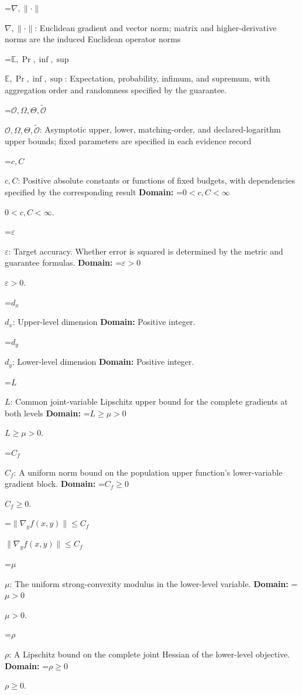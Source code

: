 \documentclass[10pt,a4paper]{article}
\newcommand{\AtlasMath}[1]{\par\begingroup\centering\setbox0=\hbox{$\displaystyle #1$}\ifdim\wd0>1.4\linewidth\typeout{ATLAS WIDE FORMULA: \the\wd0}\fi\ifdim\wd0>\linewidth\resizebox{\linewidth}{!}{\box0}\else\box0\fi\par\endgroup}
\newcommand{\AtlasInlineMath}[1]{\begingroup\setbox0=\hbox{$#1$}\ifdim\wd0>.4\linewidth\endgroup\AtlasMath{#1}\else\endgroup$#1$\fi}
\begin{document}
\AtlasInlineMath{\nabla,\|\cdot\|}: Euclidean gradient and vector norm; matrix and higher-derivative norms are the induced Euclidean operator norms



\AtlasInlineMath{\mathbb E,\Pr,\inf,\sup}: Expectation, probability, infimum, and supremum, with aggregation order and randomness specified by the guarantee.



\AtlasInlineMath{\mathcal O,\Omega,\Theta,\widetilde{\mathcal O}}: Asymptotic upper, lower, matching-order, and declared-logarithm upper bounds; fixed parameters are specified in each evidence record



\AtlasInlineMath{c,C}: Positive absolute constants or functions of fixed budgets, with dependencies specified by the corresponding result \textbf{Domain:} \AtlasInlineMath{0<c,C<\infty}.



\AtlasInlineMath{\varepsilon}: Target accuracy. Whether error is squared is determined by the metric and guarantee formulas. \textbf{Domain:} \AtlasInlineMath{\varepsilon>0}.



\AtlasInlineMath{d_x}: Upper-level dimension \textbf{Domain:} Positive integer.



\AtlasInlineMath{d_y}: Lower-level dimension \textbf{Domain:} Positive integer.



\AtlasInlineMath{L}: Common joint-variable Lipschitz upper bound for the complete gradients at both levels \textbf{Domain:} \AtlasInlineMath{L\ge\mu>0}.



\AtlasInlineMath{C_f}: A uniform norm bound on the population upper function’s lower-variable gradient block. \textbf{Domain:} \AtlasInlineMath{C_f\ge0}.



\AtlasInlineMath{\|\nabla_yf(x,y)\|\le C_f}



\AtlasInlineMath{\mu}: The uniform strong-convexity modulus in the lower-level variable. \textbf{Domain:} \AtlasInlineMath{\mu>0}.



\AtlasInlineMath{\rho}: A Lipschitz bound on the complete joint Hessian of the lower-level objective. \textbf{Domain:} \AtlasInlineMath{\rho\ge0}.
\end{document}
